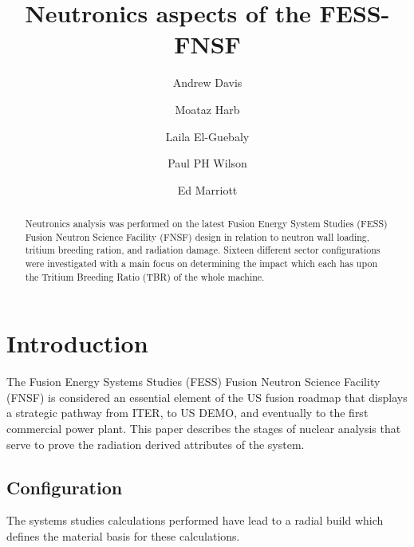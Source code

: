 \documentclass[12pt, letterpaper]{elsarticle}
\title{Neutronics aspects of the FESS-FNSF}
\author[wisc]{Andrew Davis\corref{cor1}}
\author[wisc]{Moataz Harb}
\author[wisc]{Laila El-Guebaly}
\author[wisc]{Paul PH Wilson}
\author[wisc]{Ed Marriott}
\begin{document}
 
\begin{abstract}
Neutronics analysis was performed on the latest Fusion Energy System Studies (FESS) Fusion Neutron Science Facility (FNSF) design in relation to neutron wall loading, tritium breeding ration, and radiation damage. Sixteen different sector configurations were investigated with a main focus on determining the impact which each has upon the Tritium Breeding Ratio (TBR) of the whole machine.

\end{abstract}

\begin{titlepage}
\maketitle
\end{titlepage}


\section{Introduction}
The Fusion Energy Systems Studies (FESS) Fusion Neutron Science Facility (FNSF) is considered an essential element of the US fusion roadmap that displays a strategic  pathway from ITER, to US DEMO, and eventually to the first commercial power plant. This paper describes the stages of nuclear analysis that serve to prove the radiation derived attributes of the system.

\subsection{Configuration}
The systems studies calculations performed have lead to a radial build which defines the material basis for these calculations.
\end{document}
